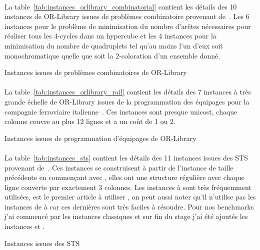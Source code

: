 \documentclass[a4paper,11pt,twoside,french,report]{../common/simplem}
\begin{document}
				\paragraph*{}
					La table~\ref{tab:instances_orlibrary_combinatorial} contient les détails des 10 instances de OR-Library issues de problèmes combinatoire provenant de~\cite{Grossman1997}. Les 6 instances  pour le problème de minimisation du nombre d'arêtes nécessaires pour réaliser tous les 4-cycles dans un hypercube et les 4 instances  pour la minimisation du nombre de quadruplets tel qu'au moins l'un d'eux soit monochromatique quelle que soit la 2-coloration d'un ensemble donné.
				\begin{table}[H]
					\centering
					\caption{Instances issues de problèmes combinatoires de OR-Library}
					\label{tab:instances_orlibrary_combinatorial}
					
				\end{table}
				\paragraph*{}
					La table~\ref{tab:instances_orlibrary_rail} contient les détails des 7 instances à très grande échelle de OR-Library issues de la programmation des équipages pour la compagnie ferroviaire italienne~\cite{Caprara2000}. Ces instances sont presque unicost, chaque colonne couvre au plus 12 lignes et a un coût de 1 ou 2.
				\begin{table}[H]
					\centering
					\caption{Instances issues de programmation d'équipages de OR-Library}
					\label{tab:instances_orlibrary_rail}
					
				\end{table}
				\paragraph*{}
					La table~\ref{tab:instances_sts} contient les détails des 11 instances issues des \gls{STS} provenant de~\cite{Fulkerson1974}. Ces instances se construisent à partir de l'instance de taille précédente en commençant avec , elles ont une structure régulière avec chaque ligne couverte par exactement 3 colonnes. Les instances  à  sont très fréquemment utilisées, \cite{Gao2015} est le premier article à utiliser , on peut aussi noter qu'il n'utilise pas les instances de  à  car ces dernières sont très faciles à résoudre. Pour nos benchmarks j'ai commencé par les instances classiques et sur fin du stage j'ai été ajoutés les instances  et .
				\begin{table}[H]
					\centering
					\caption{Instances issues des \acrshort{STS}}
					\label{tab:instances_sts}
					
				\end{table}
\end{document}
